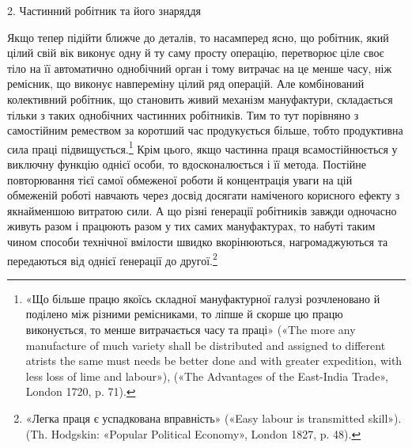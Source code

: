 2. Частинний робітник та його знаряддя

Якщо тепер підійти ближче до деталів, то насамперед ясно,
що робітник, який цілий свій вік виконує одну й ту саму просту
операцію, перетворює ціле своє тіло на її автоматично однобічний
орган і тому витрачає на це менше часу, ніж ремісник, що
виконує навпереміну цілий ряд операцій. Але комбінований
колективний робітник, що становить живий механізм мануфактури,
складається тільки з таких однобічних частинних робітників.
Тим то тут порівняно з самостійним ремеством за коротший
час продукується більше, тобто продуктивна сила праці підвищується.\footnote{
«Що більше працю якоїсь складної мануфактурної галузі розчленовано
й поділено між різними ремісниками, то ліпше й скорше цю працю виконується,
то менше витрачається часу та праці» («The more any manufacture
of much variety shall be distributed and assigned to different atrists
the same must needs be better done and with greater expedition, with less
loss of lime and labour»), («The Advantages of the East-India Trade»,
London 1720, p. 71).
}
Крім цього, якщо частинна праця всамостійнюється
у виключну функцію однієї особи, то вдосконалюється і її метода.
Постійне повторювання тієї самої обмеженої роботи й концентрація
уваги на цій обмеженій роботі навчають через досвід досягати
наміченого корисного ефекту з якнайменшою витратою сили.
А що різні ґенерації робітників завжди одночасно живуть разом
і працюють разом у тих самих мануфактурах, то набуті таким
чином способи технічної вмілости швидко вкорінюються, нагромаджуються
та передаються від однієї ґенерації до другої.\footnote{
«Легка праця є успадкована вправність» («Easy labour is transmitted
skill»). (Th. Hodgskin: «Popular Political Economy», London 1827, p. 48).
}

